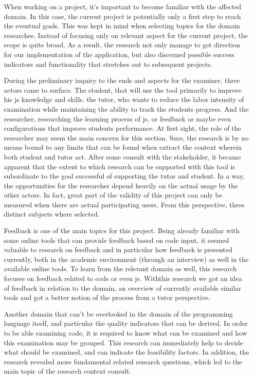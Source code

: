 When working on a project, it's important to become familiar with the affected
domain. In this case, the current project is potentially only a first step to
reach the eventual goals. This was kept in mind when selecting topics for the
domain researches. Instead of focusing only on relevant aspect for the current
project, the scope is quite broad. As a result, the research 
not only manage to get direction for our implementation of the application, 
but also discerned possible success indicators and functionality that stretches 
out to subsequent projects.

During the preliminary inquiry to the ends and aspects for the \gls{examiner},
three actors came to surface. The student, that will use the tool primarily to
improve his \gls{js} knowledge and skills. the tutor, who wants to reduce the
labor intensity of examination while maintaining the ability to track the
students progress. And the researcher, researching the learning process of
\gls{js}, or \gls{feedback} or maybe even configurations that improve students
performance. At first sight, the role of the researcher may seem the main
concern for this section. Sure, the research is by no means bound to any
limits that can be found when extract the context wherein both student and tutor
act. After some consult with the stakeholder, it became apparent that the
extent to which research can be supported with this tool is subordinate to the
goal successful of supporting the tutor and student. In a way, the opportunities
for the researcher depend heavily on the actual usage by the other actors.
In fact, great part of the validity of this project can only be measured when 
there are actual participating users. From this perspective, three distinct 
subjects where selected. 

Feedback is one of the main topics for this project. Being already familiar with 
some online tools that can provide \gls{feedback} based on code input, it seemed 
valuable to research on feedback and in particular how \gls{feedback} is 
presented currently, both in the academic environment (through an interview) as 
well in the available online tools. To learn from the relevant domain as well, 
this research focuses on \gls{feedback} related to \gls{code} or even \gls{js}. 
Withthis research we got an idea of feedback in relation to the domain, an 
overview of currently available similar tools and got a better notion of the 
process from a tutor perspective.

Another domain that can't be overlooked in the domain of the programming
language itself, and particular the quality indicators that can be derived. In
order to be able examining code, it is required to know what can be examined and
how this examination may be grouped. This research can immediately help to 
decide what should be examined, and can indicate the feasibility factors. In
addition, the research revealed more fundamental related research questions, which
led to the main topic of the research context consult.

